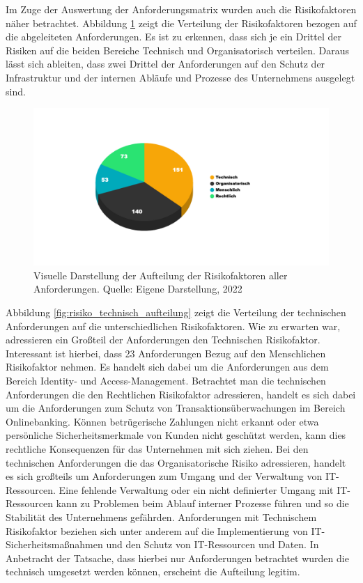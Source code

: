 Im Zuge der Auswertung der Anforderungsmatrix wurden auch die Risikofaktoren näher betrachtet. Abbildung \ref{fig:risiko_allg_aufteilung} zeigt die Verteilung der Risikofaktoren bezogen auf die abgeleiteten Anforderungen. Es ist zu erkennen, dass sich je ein Drittel der Risiken auf die beiden Bereiche \glqq{}Technisch\grqq{} und \glqq{}Organisatorisch\grqq{} verteilen. Daraus lässt sich ableiten, dass zwei Drittel der Anforderungen auf den Schutz der Infrastruktur und der internen Abläufe und Prozesse des Unternehmens ausgelegt sind. 
\begin{figure}[H]
    \centering
  \includegraphics[width=\linewidth]{images/uploads/a_figure_03.png}
  \caption{Visuelle Darstellung der Aufteilung der Risikofaktoren aller Anforderungen. Quelle: Eigene Darstellung, 2022}
  \label{fig:risiko_allg_aufteilung}
\end{figure}
\bigbreak
Abbildung \ref{fig:risiko_technisch_aufteilung} zeigt die Verteilung der technischen Anforderungen auf die unterschiedlichen Risikofaktoren. 
Wie zu erwarten war, adressieren ein Großteil der Anforderungen den \glqq{}Technischen Risikofaktor\grqq{}. Interessant ist hierbei, dass 23 Anforderungen Bezug auf den \glqq{}Menschlichen Risikofaktor\grqq{} nehmen. Es handelt sich dabei um die Anforderungen aus dem Bereich \glqq{}Identity- und Access-Management\grqq{}. Betrachtet man die technischen Anforderungen die den \glqq{}Rechtlichen Risikofaktor\grqq{} adressieren, handelt es sich dabei um die Anforderungen zum Schutz von Transaktionsüberwachungen im Bereich Onlinebanking. Können betrügerische Zahlungen nicht erkannt oder etwa persönliche Sicherheitsmerkmale von Kunden nicht geschützt werden, kann dies rechtliche Konsequenzen für das Unternehmen mit sich ziehen. Bei den technischen Anforderungen die das \glqq{}Organisatorische Risiko\grqq{} adressieren, handelt es sich großteils um Anforderungen zum Umgang und der Verwaltung von IT-Ressourcen. Eine fehlende Verwaltung oder ein nicht definierter Umgang mit IT-Ressourcen kann zu Problemen beim Ablauf interner Prozesse führen und so die Stabilität des Unternehmens gefährden. Anforderungen mit \glqq{}Technischem Risikofaktor\grqq{} beziehen sich unter anderem auf die Implementierung von IT-Sicherheitsmaßnahmen und den Schutz von IT-Ressourcen und Daten. In Anbetracht der Tatsache, dass hierbei nur Anforderungen betrachtet wurden die technisch umgesetzt werden können, erscheint die Aufteilung legitim. 
